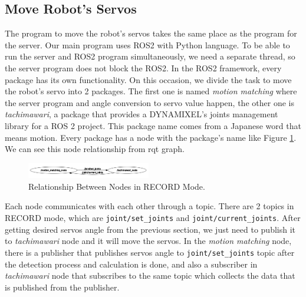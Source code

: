   \subsection{Move Robot's Servos}
  \label{subsec:move-robot-servo}
  
  The program to move the robot's servos takes the same place as the program for the server. Our main program uses ROS2 with Python language. To be able to run the server and ROS2 program simultaneously, we need a separate thread, so the server program does not block the ROS2.
  In the ROS2 framework, every package has its own functionality. On this occasion, we divide the task to move the robot's servo into 2 packages. The first one is named \emph{motion matching} where the server program and angle conversion to servo value happen, the other one is \emph{tachimawari},
  a package that provides a DYNAMIXEL's joints management library for a ROS 2 project. This package name comes from a Japanese word that means motion. Every package has a node with the package's name like Figure \ref{fig:relation-node-record-mode}.
  We can see this node relationship from rqt graph.
  \begin{figure}[ht]
    \centering
    \includegraphics[width=0.48\textwidth]{gambar/rqt_without_akushon.png}
    \caption{Relationship Between Nodes in RECORD Mode.}
    \label{fig:relation-node-record-mode}
  \end{figure}
  
  Each node communicates with each other through a topic. There are 2 topics in RECORD mode, which are \verb|joint/set_joints| and \verb|joint/current_joints|. 
  After getting desired servos angle from the previous section, we just need to publish it to \emph{tachimawari} node and it will move the servos. In the \emph{motion matching} node, there is a publisher that publishes servos angle to \verb|joint/set_joints| topic after the detection process and calculation is done, and also a subscriber in \emph{tachimawari} node that subscribes
  to the same topic which collects the data that is published from the publisher. 
  
